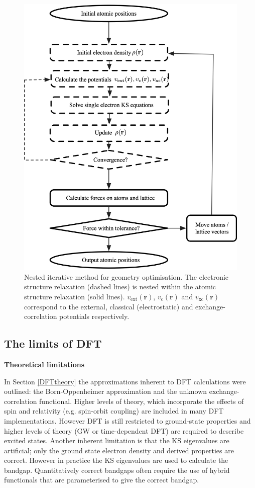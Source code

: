 \begin{figure}[h]
\centering
  \includegraphics[width=0.7\columnwidth]{figures/ch3/scf.png}
  \caption[Nested iterative method for geometry optimisation]{Nested iterative method for geometry optimisation. The electronic structure relaxation (dashed lines) is nested within the atomic structure relaxation (solid lines). $v_\textrm{ext}(\textbf{r})$, $v_\textrm{c}(\textbf{r})$ and $v_\textrm{xc}(\textbf{r})$ correspond to the external, classical (electrostatic) and exchange-correlation potentials respectively.} 
  \label{SCF}
\end{figure}

\subsection{The limits of DFT} \label{numericalsubsection}


\textbf{Theoretical limitations} 

In Section \ref{DFTtheory} the approximations inherent to DFT calculations were outlined: the Born-Oppenheimer approximation and the unknown exchange-correlation functional. Higher levels of theory, which incorporate the effects of spin and relativity (e.g. spin-orbit coupling) are included in many DFT implementations. However DFT is still restricted to ground-state properties and higher levels of theory (GW or time-dependent DFT) are required to describe excited states. Another inherent limitation is that the KS eigenvalues are artificial; only the ground state electron density and derived properties are correct. However in practice the KS eigenvalues are used to calculate the bandgap. Quantitatively correct bandgaps often require the use of hybrid functionals that are parameterised to give the correct bandgap.

